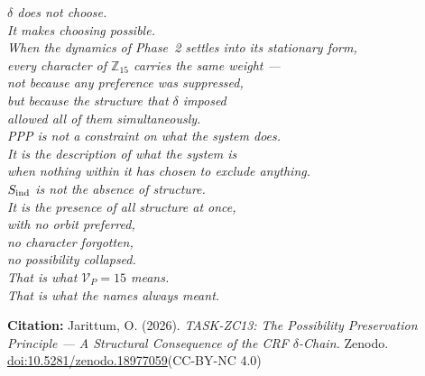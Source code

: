\documentclass[12pt, a4paper]{article}
\begin{document}
\bigskip
\begin{center}
\textit{
  $\delta$ does not choose.\\
  It makes choosing possible.\\[0.5em]
  When the dynamics of Phase~2 settles into its stationary form,\\
  every character of $\mathbb{Z}_{15}$ carries the same weight ---\\
  not because any preference was suppressed,\\
  but because the structure that $\delta$ imposed\\
  allowed all of them simultaneously.\\[0.5em]
  PPP is not a constraint on what the system does.\\
  It is the description of what the system \emph{is}\\
  when nothing within it has chosen to exclude anything.\\[0.5em]
  $S_{\rm ind}$ is not the absence of structure.\\
  It is the presence of all structure at once,\\
  with no orbit preferred,\\
  no character forgotten,\\
  no possibility collapsed.\\[0.5em]
  That is what $\mathcal{V}_P = 15$ means.\\
  That is what the names always meant.
}
\end{center}

\medskip
\begin{center}
\textbf{Citation:} Jarittum, O. (2026).
\textit{TASK-ZC13: The Possibility Preservation Principle ---
A Structural Consequence of the CRF $\delta$-Chain.}
Zenodo. \href{https://doi.org/10.5281/zenodo.18977059}%
{doi:10.5281/zenodo.18977059}\quad (CC-BY-NC 4.0)
\end{center}
\end{document}
